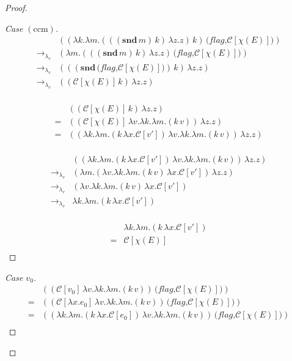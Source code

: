 \documentclass[ms,electronic,twosidetoc,letterpaper,chaptercenter,parttop]{byumsphd}
\begin{document}
\begin{proof}
\begin{proof}[Case $(\mathrm{ccm})$]
\begin{align*}
                        &((\lambda k.\lambda m.(((\mathbf{snd}\,m)\,k)\,\lambda z.z)\,k)\,\textbf{(}\textit{flag}\textbf{,}\mathcal{C}[\chi(E)]\textbf{)})\\
\rightarrow_{\lambda_v} &(\lambda m.(((\mathbf{snd}\,m)\,k)\,\lambda z.z)\,\textbf{(}\textit{flag}\textbf{,}\mathcal{C}[\chi(E)]\textbf{)})\\
\rightarrow_{\lambda_v} &(((\mathbf{snd}\,\textbf{(}\textit{flag}\textbf{,}\mathcal{C}[\chi(E)]\textbf{)})\,k)\,\lambda z.z)\\
\rightarrow_{\lambda_v} &((\mathcal{C}[\chi(E)]\,k)\,\lambda z.z)\\
\end{align*}

\begin{align*}
  &((\mathcal{C}[\chi(E)]\,k)\,\lambda z.z)\\
= &((\mathcal{C}[\chi(E)]\,\lambda v.\lambda k.\lambda m.(k\,v))\,\lambda z.z)\\
= &((\lambda k.\lambda m.(k\,\lambda x.\mathcal{C}[v'])\,\lambda v.\lambda k.\lambda m.(k\,v))\,\lambda z.z)\\
\end{align*}

\begin{align*}
                        &((\lambda k.\lambda m.(k\,\lambda x.\mathcal{C}[v'])\,\lambda v.\lambda k.\lambda m.(k\,v))\,\lambda z.z)\\
\rightarrow_{\lambda_v} &(\lambda m.(\lambda v.\lambda k.\lambda m.(k\,v)\,\lambda x.\mathcal{C}[v'])\,\lambda z.z)\\
\rightarrow_{\lambda_v} &(\lambda v.\lambda k.\lambda m.(k\,v)\,\lambda x.\mathcal{C}[v'])\\
\rightarrow_{\lambda_v} &\lambda k.\lambda m.(k\,\lambda x.\mathcal{C}[v'])\\
\end{align*}

\begin{align*}
  &\lambda k.\lambda m.(k\,\lambda x.\mathcal{C}[v'])\\
= &\mathcal{C}[\chi(E)]\\
\end{align*}

\end{proof}

\begin{proof}[Case $v_0$]
\begin{align*}
  &((\mathcal{C}[v_0]\,\lambda v.\lambda k.\lambda m.(k\,v))\,\textbf{(}\textit{flag}\textbf{,}\mathcal{C}[\chi(E)]\textbf{)})\\
= &((\mathcal{C}[\lambda x.e_0]\,\lambda v.\lambda k.\lambda m.(k\,v))\,\textbf{(}\textit{flag}\textbf{,}\mathcal{C}[\chi(E)]\textbf{)})\\
= &((\lambda k.\lambda m.(k\,\lambda x.\mathcal{C}[e_0])\,\lambda v.\lambda k.\lambda m.(k\,v))\,\textbf{(}\textit{flag}\textbf{,}\mathcal{C}[\chi(E)]\textbf{)})\\
\end{align*}


\end{proof}
\end{proof}
\end{document}
